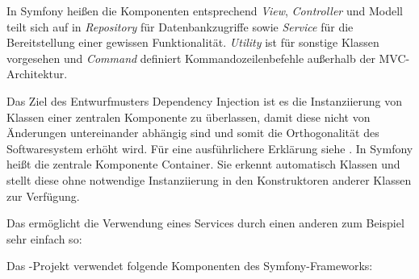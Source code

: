 In Symfony heißen die Komponenten entsprechend \emph{View}, \emph{Controller} und Modell teilt sich auf in \emph{Repository} für Datenbankzugriffe sowie \emph{Service} für die Bereitstellung einer gewissen Funktionalität. \emph{Utility} ist für sonstige Klassen vorgesehen und \emph{Command} definiert Kommandozeilenbefehle außerhalb der MVC-Architektur. 


Das Ziel des Entwurfmusters Dependency Injection ist es die Instanziierung von Klassen einer zentralen Komponente zu überlassen, damit diese nicht von Änderungen untereinander abhängig sind und somit die Orthogonalität des Softwaresystem erhöht wird. Für eine ausführlichere Erklärung siehe \cite{seemann2019dependency}. In Symfony heißt die zentrale Komponente Container. Sie erkennt automatisch Klassen und stellt diese ohne notwendige Instanziierung in den Konstruktoren anderer Klassen zur Verfügung.

Das ermöglicht die Verwendung eines Services durch einen anderen zum Beispiel sehr einfach so:

\begin{Code}
class UmsteigerService {

    public function __construct(
        private readonly DataService $dataService
    ) {}

    public function searchAllUmsteigerVertical (
        string $system, $function = null): array {

        foreach ($this->dataService->getVersions($system) as $version) {
        // ...
\end{Code}


Das \bfarmer-Projekt verwendet folgende Komponenten des Symfony-Frameworks:

